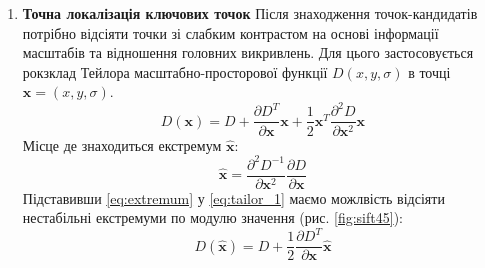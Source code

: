 \begin{enumerate}
    \item \textbf{Точна локалізація ключових точок}
        Після знаходження точок-кандидатів потрібно відсіяти точки зі слабким контрастом на основі
        інформації масштабів та відношення головних викривлень. Для цього застосовується рокзклад
        Тейлора масштабно-просторової функції $D(x,y,\sigma)$ в точці $\textbf{x} = (x,y,\sigma)$.
        \begin{equation}
            D(\textbf{x}) = D + \frac{\partial D^T }{\partial \textbf{x} }\textbf{x} + 
                       \frac{1}{2}\textbf{x}^T\frac{\partial^2 D}{\partial \textbf{x}^2}\textbf{x}
            \label{eq:tailor_1}
        \end{equation}
        Місце де знаходиться екстремум $\widehat{\textbf{x}}$:
        \begin{equation}
            \widehat{\textbf{x}} = \frac{\partial^2 D^{-1} }{\partial
                                    \textbf{x}^2}\frac{\partial D }{\partial \textbf{x}}
            \label{eq:extremum}
        \end{equation}
        Підставивши \ref{eq:extremum} у  \ref{eq:tailor_1} маємо можлвість відсіяти нестабільні
        екстремуми по модулю значення (рис. \ref{fig:sift45}):
        \begin{equation}
            D(\widehat{\textbf{x}}) = D + \frac{1}{2}\frac{\partial D^{T} }{\partial \textbf{x}}\widehat{\textbf{x}}
        \end{equation}


\end{enumerate}

